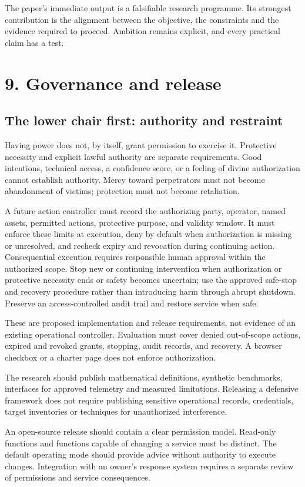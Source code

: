\documentclass[11pt]{article}
\begin{document}
The paper's immediate output is a falsifiable research programme. Its strongest contribution is the alignment between the objective, the constraints and the evidence required to proceed. Ambition remains explicit, and every practical claim has a test.

\clearpage
\section*{9. Governance and release}

\subsection*{The lower chair first: authority and restraint}
Having power does not, by itself, grant permission to exercise it. Protective necessity and explicit lawful authority are separate requirements. Good intentions, technical access, a confidence score, or a feeling of divine authorization cannot establish authority. Mercy toward perpetrators must not become abandonment of victims; protection must not become retaliation.

A future action controller must record the authorizing party, operator, named assets, permitted actions, protective purpose, and validity window. It must enforce these limits at execution, deny by default when authorization is missing or unresolved, and recheck expiry and revocation during continuing action. Consequential execution requires responsible human approval within the authorized scope. Stop new or continuing intervention when authorization or protective necessity ends or safety becomes uncertain; use the approved safe-stop and recovery procedure rather than introducing harm through abrupt shutdown. Preserve an access-controlled audit trail and restore service when safe.

These are proposed implementation and release requirements, not evidence of an existing operational controller. Evaluation must cover denied out-of-scope actions, expired and revoked grants, stopping, audit records, and recovery. A browser checkbox or a charter page does not enforce authorization.

The research should publish mathematical definitions, synthetic benchmarks, interfaces for approved telemetry and measured limitations. Releasing a defensive framework does not require publishing sensitive operational records, credentials, target inventories or techniques for unauthorized interference.

An open-source release should contain a clear permission model. Read-only functions and functions capable of changing a service must be distinct. The default operating mode should provide advice without authority to execute changes. Integration with an owner's response system requires a separate review of permissions and service consequences.
\end{document}
